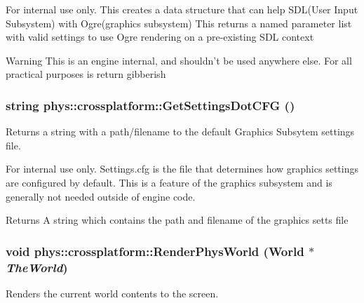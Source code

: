 \begin{DoxyInternal}{For internal use only.}
This creates a data structure that can help SDL(User Input Subsystem) with Ogre(graphics subsystem) This returns a named parameter list with valid settings to use Ogre rendering on a pre-\/existing SDL context \begin{DoxyWarning}{Warning}
This is an engine internal, and shouldn't be used anywhere else. For all practical purposes is return gibberish 
\end{DoxyWarning}
\end{DoxyInternal}
\hypertarget{namespacephys_1_1crossplatform_a2d43f3aa5a485564c3f375b36a08152f}{
\subsubsection[{GetSettingsDotCFG}]{\setlength{\rightskip}{0pt plus 5cm}string phys::crossplatform::GetSettingsDotCFG ()}}
\label{d4/d59/namespacephys_1_1crossplatform_a2d43f3aa5a485564c3f375b36a08152f}


Returns a string with a path/filename to the default Graphics Subsytem settings file. 

\begin{DoxyInternal}{For internal use only.}
Settings.cfg is the file that determines how graphics settings are configured by default. This is a feature of the graphics subsystem and is generally not needed outside of engine code. \begin{DoxyReturn}{Returns}
A string which contains the path and filename of the graphics setts file 
\end{DoxyReturn}
\end{DoxyInternal}
\hypertarget{namespacephys_1_1crossplatform_aa80d0a5289b00daad110fd29bf23c5e7}{
\subsubsection[{RenderPhysWorld}]{\setlength{\rightskip}{0pt plus 5cm}void phys::crossplatform::RenderPhysWorld (World $\ast$ {\em TheWorld})}}
\label{d4/d59/namespacephys_1_1crossplatform_aa80d0a5289b00daad110fd29bf23c5e7}


Renders the current world contents to the screen. 

